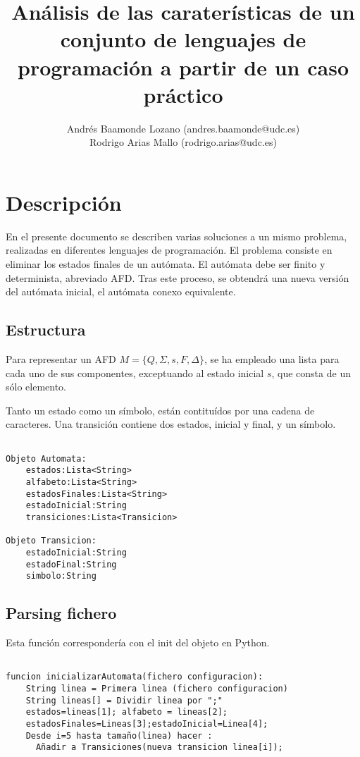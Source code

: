 \documentclass[12pt,a4paper]{article}
\title{Análisis de las caraterísticas de un conjunto de lenguajes de
programación a partir de un caso práctico}
\author{Andrés Baamonde Lozano (andres.baamonde@udc.es)\\
	Rodrigo Arias Mallo (rodrigo.arias@udc.es)}
\begin{document}
\maketitle


\section{Descripción}

En el presente documento se describen varias soluciones a un mismo problema,
realizadas en diferentes lenguajes de programación. El problema consiste en
eliminar los estados finales de un autómata. El autómata debe ser finito y
determinista, abreviado AFD. Tras este proceso, se obtendrá una nueva versión
del autómata inicial, el autómata conexo equivalente.  

\subsection{Estructura}

Para representar un AFD $M = \{ Q, \Sigma, s, F, \Delta \} $, se ha empleado una 
lista para cada uno de sus componentes, exceptuando al estado inicial $s$, que 
consta de un sólo elemento.

Tanto un estado como un símbolo, están contituídos por una cadena de caracteres.  
Una transición contiene dos estados, inicial y final, y un símbolo.

\begin{lstlisting}

Objeto Automata:
	estados:Lista<String>
	alfabeto:Lista<String>
	estadosFinales:Lista<String>
	estadoInicial:String
	transiciones:Lista<Transicion>

Objeto Transicion:
	estadoInicial:String
	estadoFinal:String
	simbolo:String

\end{lstlisting}
\subsection{Parsing fichero}
Esta función correspondería con el init del objeto en Python.
\begin{lstlisting}

funcion inicializarAutomata(fichero configuracion):
	String linea = Primera linea (fichero configuracion)
	String lineas[] = Dividir linea por ";"
	estados=lineas[1]; alfabeto = lineas[2];
	estadosFinales=Lineas[3];estadoInicial=Linea[4];
	Desde i=5 hasta tamaño(linea) hacer :
	  Añadir a Transiciones(nueva transicion linea[i]);
	  
\end{lstlisting}
\end{document}
